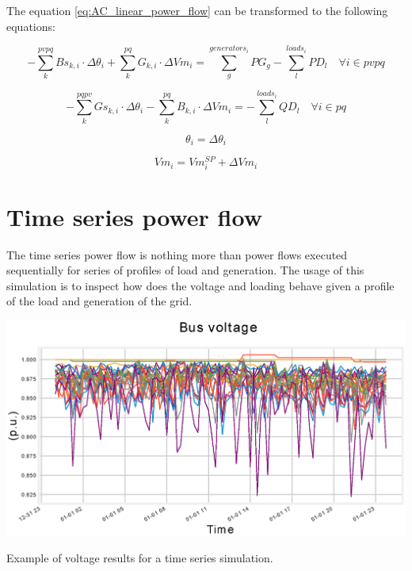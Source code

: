 \documentclass[nols,a4paper,twoside,notoc,fleqn]{tufte-book}
\begin{document}
The equation \ref{eq:AC_linear_power_flow} can be transformed to the following equations:

\begin{equation}
-\sum_{k}^{pvpq}Bs_{k,i} \cdot \Delta\theta_i + \sum_{k}^{pq}G_{k,i} \cdot \Delta Vm_i = \sum_{g}^{generators_i} PG_{g} - \sum_{l}^{loads_i} PD_l \quad \forall i \in pvpq
\end{equation}

\begin{equation}
-\sum_{k}^{pqpv}Gs_{k,i} \cdot \Delta\theta_i - \sum_{k}^{pq}B_{k,i} \cdot \Delta Vm_i = - \sum_{l}^{loads_i} QD_l \quad \forall i \in pq
\end{equation}

\begin{equation}
\theta_i = \Delta \theta_i
\end{equation}

\begin{equation}
Vm_i = Vm_i^{SP} + \Delta Vm_i
\end{equation}

\chapter{Time series power flow}

The time series power flow is nothing more than power flows executed sequentially for series of profiles of load and generation. The usage of this simulation is to inspect how does the voltage and loading behave given a profile of the load and generation of the grid.

\begin{marginfigure}
	\includegraphics[width=\linewidth]{img/Time_series.eps}
	\caption{Example of voltage results for a time series simulation.}
	\label{fig:time_series}
\end{marginfigure}
\end{document}
